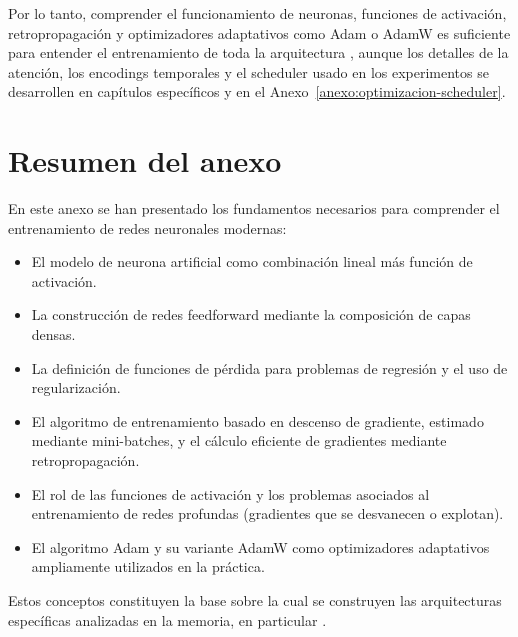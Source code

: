 Por lo tanto, comprender el funcionamiento de neuronas, funciones de activación, retropropagación y optimizadores adaptativos como Adam o AdamW es suficiente para entender el entrenamiento de toda la arquitectura \CTTransformer, aunque los detalles de la atención, los encodings temporales y el scheduler usado en los experimentos se desarrollen en capítulos específicos y en el Anexo~\ref{anexo:optimizacion-scheduler}.

\section{Resumen del anexo}

En este anexo se han presentado los fundamentos necesarios para comprender el entrenamiento de redes neuronales modernas:
\begin{itemize}
    \item El modelo de neurona artificial como combinación lineal más función de activación.
    \item La construcción de redes feedforward mediante la composición de capas densas.
    \item La definición de funciones de pérdida para problemas de regresión y el uso de regularización.
    \item El algoritmo de entrenamiento basado en descenso de gradiente, estimado mediante mini-batches, y el cálculo eficiente de gradientes mediante retropropagación.
    \item El rol de las funciones de activación y los problemas asociados al entrenamiento de redes profundas (gradientes que se desvanecen o explotan).
    \item El algoritmo Adam y su variante AdamW como optimizadores adaptativos ampliamente utilizados en la práctica.
\end{itemize}

Estos conceptos constituyen la base sobre la cual se construyen las arquitecturas específicas analizadas en la memoria, en particular \CTTransformer.
